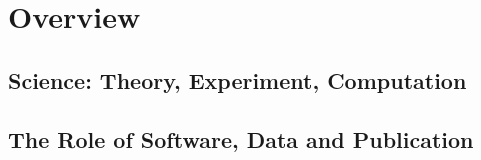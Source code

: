 \chapter{Overview}

\section{Science: Theory, Experiment, Computation}

\section{The Role of Software, Data and Publication}
